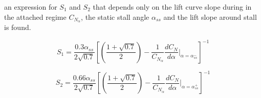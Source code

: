 \documentclass{article}
\begin{document}
\noindent an expression for $S_1$ and $S_2$ that depends only on the lift curve slope during in the attached regime $C_{N_\alpha}$, the static stall angle $\alpha_{ss}$ and the lift slope around stall is found.

\begin{equation}
S_1 = \frac{0.3\alpha_{ss}}{2\sqrt{0.7}}\left[\left(\frac{1+\sqrt{0.7}}{2}\right)-\frac{1}{C_{N_\alpha}}\frac{dC_N}{d\alpha}|_{\alpha=\alpha_{ss}^{-}}\right]^{-1}
\end{equation}

\begin{equation}
S_2 = \frac{0.66\alpha_{ss}}{2\sqrt{0.7}}\left[\left(\frac{1+\sqrt{0.7}}{2}\right)-\frac{1}{C_{N_\alpha}}\frac{dC_N}{d\alpha}|_{\alpha=\alpha_{ss}^{+}}\right]^{-1}
\end{equation}
\end{document}
